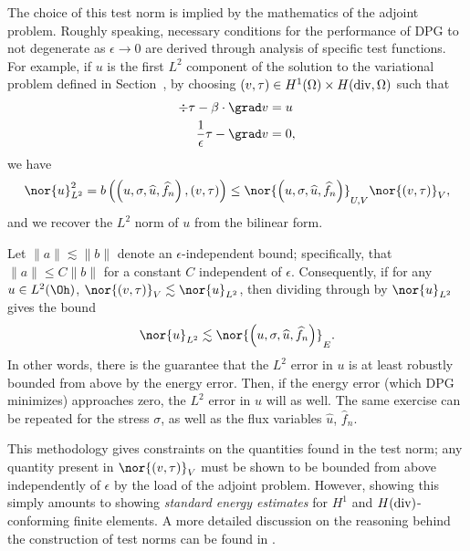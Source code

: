The choice of this test norm is implied by the mathematics of the adjoint problem. Roughly speaking, necessary conditions for the performance of DPG to not degenerate as $\epsilon \rightarrow 0$ are derived through analysis of specific test functions. For example, if $u$ is the first $L^2$ component of the solution to the variational problem defined in Section~, by choosing $(v,\tau) \in H^1(\Omega) \times H({\rm div},\Omega)$ such that 
\begin{align*}
\div \tau - \beta \cdot \grad v &= u \\
\frac{1}{\epsilon} \tau - \grad v &= 0,
\end{align*}
we have
\[
 \nor{u}_{L^2}^2 = b\left(\left(u,\sigma,\widehat{u},\widehat{f}_n\right),\left(v,\tau\right)\right) \leq \nor{\left(u,\sigma,\widehat{u},\widehat{f}_n\right)}_{U,V} \nor{\left(v,\tau\right)}_V,
\]
and we recover the $L^2$ norm of $u$ from the bilinear form.

Let $\|a\| \lesssim \|b\|$ denote an $\epsilon$-independent bound; specifically, that $\|a\| \leq C\|b\|$ for a constant $C$ independent of $\epsilon$. Consequently, if for any $u\in L^2(\Oh)$, $\nor{\left(v,\tau\right)}_V\lesssim \nor{u}_{L^2}$, then dividing through by $\nor{u}_{L^2}$ gives the bound
\[
 \nor{u}_{L^2} \lesssim \nor{\left(u,\sigma,\widehat{u},\widehat{f}_n\right)}_E.
\]
In other words, there is the guarantee that the $L^2$ error in $u$ is at least robustly bounded from above by the energy error. Then, if the energy error (which DPG minimizes) approaches zero, the $L^2$ error in $u$ will as well. The same exercise can be repeated for the stress $\sigma$, as well as the flux variables $\widehat{u}$, $\widehat{f}_n$. 

This methodology gives constraints on the quantities found in the test norm; any quantity present in $\nor{\left(v,\tau\right)}_V$ must be shown to be bounded from above independently of $\epsilon$ by the load of the adjoint problem. However, showing this simply amounts to showing \textit{standard energy estimates} for $H^1$ and $H({\rm div})$-conforming finite elements. A more detailed discussion on the reasoning behind the construction of test norms can be found in \cite{DPGrobustness}. 

